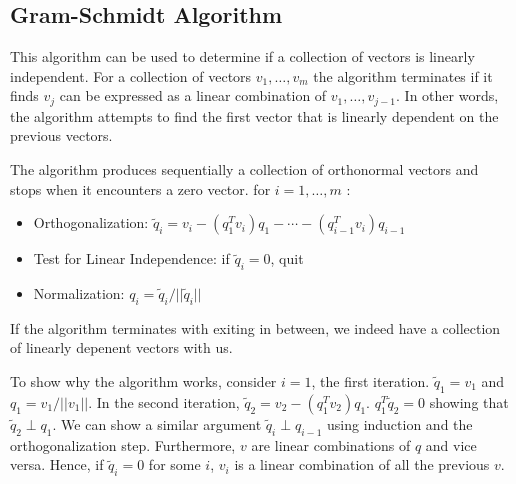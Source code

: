 \documentclass[../../linear_algebra.tex]{subfiles}
\begin{document}
\subsection{Gram-Schmidt Algorithm}
This algorithm can be used to determine if a collection of vectors is linearly independent. For a collection of vectors $v_{1}, \ldots, v_{m}$ the algorithm terminates if it finds $v_{j}$ can be expressed as a linear combination of $v_{1}, \ldots, v_{j-1}$. In other words, the algorithm attempts to find the first vector that is linearly dependent on the previous vectors.\newline

The algorithm produces sequentially a collection of orthonormal vectors and stops when it encounters a zero vector.\newline
for $i = 1, \ldots, m$ :
\begin{itemize}
    \item Orthogonalization: $\tilde{q}_{i} = v_{i} - (q_{1}^{T}v_{i})q_{1} - \cdots - (q_{i-1}^{T}v_{i})q_{i-1}$
    \item Test for Linear Independence: if $\tilde{q}_{i} = 0$, quit
    \item Normalization: $q_{i} = \tilde{q}_{i}/ \lvert\lvert \tilde{q}_{i} \rvert\rvert$
\end{itemize}
If the algorithm terminates with exiting in between, we indeed have a collection of linearly depenent vectors with us.\newline

To show why the algorithm works, consider $i = 1$, the first iteration. $\tilde{q}_{1} = v_{1}$ and $q_{1} = v_{1}/\lvert\lvert v_{1} \rvert\rvert$. In the second iteration, $\tilde{q}_{2} = v_{2} - (q_{1}^{T}v_{2})q_{1}$. $q_{1}^{T}\tilde{q}_{2} = 0$ showing that $\tilde{q}_{2} \perp q_{1}$. We can show a similar argument $\tilde{q}_{i} \perp q_{i-1}$ using induction and the orthogonalization step. Furthermore, $v$ are linear combinations of $q$ and vice versa. Hence, if $\tilde{q}_{i} = 0$ for some $i$, $v_{i}$ is a linear combination of all the previous $v$.
\end{document}
